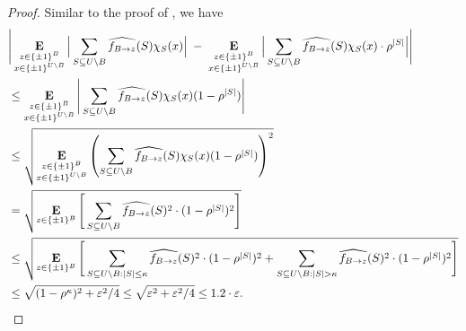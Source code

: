 \documentclass[10pt,a4paper]{article}
\theoremstyle{plain}
\theoremstyle{remark}
\theoremstyle{plain}
\providecommand{\E}{}
\renewcommand{\E}{\mathop{\bf E\/}}
\newcommand{\eps}{\varepsilon}
\renewcommand{\hat}{\widehat}
\newcommand{\pmone}{\{\pm 1\}}
\newcommand{\fourierCutoff}{\kappa}
\begin{document}
\begin{proof}
Similar to the proof of , we have
\begin{align*}
   & \Bigg|\E_{\substack{z \in \pmone^{B}\\x \in \pmone^{U \setminus B}}}
     \Big | \sum_{S \subseteq U\setminus B} \hat{f_{B \to z}}(S)\chi_S(x)\Big|
     \;-\;\E_{\substack{z \in \pmone^{B}\\x \in \pmone^{U \setminus B}}}
     \Big |\sum_{\substack{S \subseteq U\setminus B}} \hat{f_{B \to z}}(S)\chi_S(x) \cdot \rho^{|S|}\Big|\Bigg|     \\
      &\le 
\E_{\substack{z \in \pmone^{B}\\x \in \pmone^{U \setminus B}}}
     \Bigg |\sum_{\substack{S \subseteq U\setminus B}} \hat{f_{B \to z}}(S)\chi_S(x) (1-\rho^{|S|}) \Bigg|\\
     &\le \sqrt{\E_{\substack{z \in \pmone^{B}\\x \in \pmone^{U \setminus B}}}
    \left(\sum_{\substack{S \subseteq U\setminus B}} \hat{f_{B \to z}}(S)\chi_S(x) (1-\rho^{|S|})\right)^2} 
    \\&= \sqrt{\E_{z \in \pmone^{B}}\Bigg[\sum_{\substack{S\subseteq U\setminus B}}\hat{f_{B\to z}}(S)^2\cdot (1-\rho^{|S|})^2\Bigg]} \\
    &\leq 
    \sqrt{\E_{z \in \pmone^{B}}\Bigg[\sum_{\substack{S\subseteq U\setminus B:|S|\le \fourierCutoff}}\hat{f_{B\to z}}(S)^2\cdot (1-\rho^{|S|})^2 + \sum_{\substack{S\subseteq U\setminus B:|S|> \fourierCutoff}}\hat{f_{B\to z}}(S)^2\cdot (1-\rho^{|S|})^2\Bigg]}\\
    &\le\sqrt{ (1-\rho^{\fourierCutoff})^2 + \eps^2/4} 
    \le \sqrt{ \eps^2 + \eps^2/4} \le 1.2 \cdot \eps.\qedhere
     \end{align*}
\end{proof}
\end{document}
